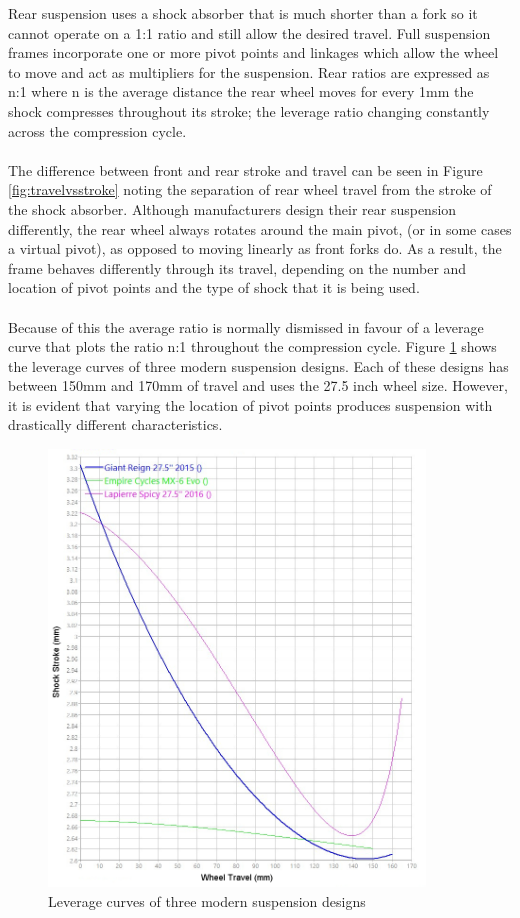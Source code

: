 		Rear suspension uses a shock absorber that is much shorter than a fork so it cannot operate on a 1:1 ratio and still allow the desired travel. Full suspension frames incorporate one or more pivot points and linkages which allow the wheel to move and act as multipliers for the suspension. Rear ratios are expressed as n:1 where n is the average distance the rear wheel moves for every 1mm the shock compresses throughout its stroke; the leverage ratio changing constantly across the compression cycle.
		\\\\
		The difference between front and rear stroke and travel can be seen in Figure \ref{fig:travelvsstroke} noting the separation of rear wheel travel from the stroke of the shock absorber. Although manufacturers design their rear suspension differently, the rear wheel always rotates around the main pivot, (or in some cases a virtual pivot), as opposed to moving linearly as front forks do. As a result, the frame behaves differently through its travel, depending on the number and location of pivot points and the type of shock that it is being used. 
		\\\\
		Because of this the average ratio is normally dismissed in favour of a leverage curve that plots the ratio n:1 throughout the compression cycle. Figure \ref{fig:3_bike_lev_ratio} shows the leverage curves of three modern suspension designs. Each of these designs has between 150mm and 170mm of travel and uses the 27.5 inch wheel size. However, it is evident that varying the location of pivot points produces suspension with drastically different characteristics.
		\begin{figure}[h!]
			\centering
			\includegraphics[width=10cm]{../images/3_bike_lev_ratio.jpg}
			\caption{Leverage curves of three modern suspension designs}
			\label{fig:3_bike_lev_ratio}
		\end{figure}
